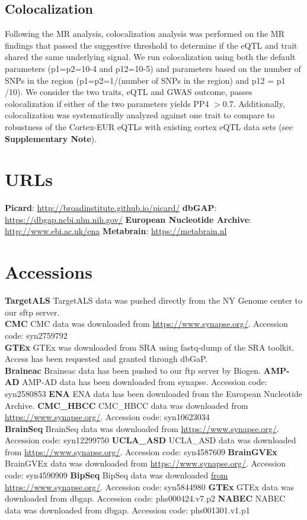 \subsection{Colocalization}
Following the MR analysis, colocalization analysis was performed on the MR findings that passed the suggestive threshold to determine if the eQTL and trait shared the same underlying signal. We run colocalization using both the default parameters (p1=p2=10-4 and p12=10-5) and parameters based on the number of SNPs in the region (p1=p2=1/(number of SNPs in the region) and p12 = p1 /10). We consider the two traits, eQTL and GWAS outcome, passes colocalization if either of the two parameters yields PP4 $>$0.7. Additionally, colocalization was systematically analyzed against one trait to compare to robustness of the Cortex-EUR eQTLs with existing cortex eQTL data sets (see \textbf{Supplementary Note}). 

\section*{URLs}
\textbf{Picard}: \url{http://broadinstitute.github.io/picard/}
\textbf{dbGAP}: \url{https://dbgap.ncbi.nlm.nih.gov/}
\textbf{European Nucleotide Archive}: \url{http://www.ebi.ac.uk/ena}
\textbf{Metabrain}: \url{https://metabrain.nl }

\section*{Accessions}
\textbf{TargetALS} TargetALS data was pushed directly from the NY Genome center to our sftp server. \\
\textbf{CMC} CMC data was downloaded from \url{https://www.synapse.org/}. Accession code: syn2759792 \\
\textbf{GTEx} GTEx was downloaded from SRA using fastq-dump of the SRA toolkit. Access has been requested and granted through dbGaP. \\
\textbf{Braineac} Braineac data has been pushed to our ftp server by Biogen. 
\textbf{AMP-AD} AMP-AD data has been downloaded from synapse. Accession code: syn2580853 
\textbf{ENA} ENA data has been downloaded from the European Nucleotide Archive.
\textbf{CMC\_HBCC} CMC\_HBCC data was downloaded from \url{https://www.synapse.org/}. Accession code: syn10623034 \\
\textbf{BrainSeq} BrainSeq data was downloaded from \url{https://www.synapse.org/}. Accession code: syn12299750 
\textbf{UCLA\_ASD} UCLA\_ASD data was downloaded from \url{https://www.synapse.org/}. Accession code: syn4587609 
\textbf{BrainGVEx} BrainGVEx data was downloaded from \url{https://www.synapse.org/}. Accession code: syn4590909 
\textbf{BipSeq} BipSeq data was downloaded \url{from https://www.synapse.org/}. Accession code: syn5844980 
\textbf{GTEx} GTEx data was downloaded from dbgap. Accession code: phs000424.v7.p2 
\textbf{NABEC} NABEC data was downloaded from dbgap. Accession code: phs001301.v1.p1 

